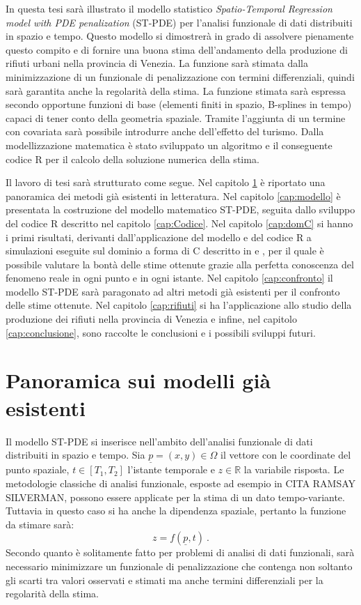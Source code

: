 \documentclass[a4paper,11pt,twoside,openright]{book}							%
\begin{document}
In questa tesi sarà illustrato il modello statistico \textit{Spatio-Temporal Regression model with PDE penalization} (ST-PDE) per l'analisi funzionale di dati distribuiti in spazio e tempo. Questo modello si dimostrerà in grado di assolvere pienamente questo compito e di fornire una buona stima dell'andamento della produzione di rifiuti urbani nella provincia di Venezia. La funzione sarà stimata dalla minimizzazione di un funzionale di penalizzazione con termini differenziali, quindi sarà garantita anche la regolarità della stima. La funzione stimata sarà espressa secondo opportune funzioni di base (elementi finiti in spazio, B-splines in tempo) capaci di tener conto della geometria spaziale. Tramite l'aggiunta di un termine con covariata sarà possibile introdurre anche dell'effetto del turismo. Dalla modellizzazione matematica è stato sviluppato un algoritmo e il conseguente codice R per il calcolo della soluzione numerica della stima. 

Il lavoro di tesi sarà strutturato come segue. Nel capitolo \ref{cap:panoramica} è riportato una panoramica dei metodi già esistenti in letteratura. Nel capitolo \ref{cap:modello} è presentata la costruzione del modello matematico ST-PDE, seguita dallo sviluppo del codice R descritto nel capitolo \ref{cap:Codice}. Nel capitolo \ref{cap:domC} si hanno i primi risultati, derivanti dall'applicazione del modello e del codice R a simulazioni eseguite sul dominio a forma di C descritto in \cite{art:ramsay} e \cite{art:wood}, per il quale è possibile valutare la bontà delle stime ottenute grazie alla perfetta conoscenza del fenomeno reale in ogni punto e in ogni istante. Nel capitolo \ref{cap:confronto} il modello ST-PDE sarà paragonato ad altri metodi già esistenti per il confronto delle stime ottenute. Nel capitolo \ref{cap:rifiuti} si ha l'applicazione allo studio della produzione dei rifiuti nella provincia di Venezia e infine, nel capitolo \ref{cap:conclusione}, sono raccolte le conclusioni e i possibili sviluppi futuri.
\newpage
\thispagestyle{empty}

\chapter{Panoramica sui modelli già esistenti}
\label{cap:panoramica}

Il modello ST-PDE si inserisce nell'ambito dell'analisi funzionale di dati distribuiti in spazio e tempo. Sia $\underline p = (x,y) \in \Omega$ il vettore con le coordinate del punto spaziale, $t \in [T_1,T_2]$ l'istante temporale e $z \in \mathbb{R}$ la variabile risposta. Le metodologie classiche di analisi funzionale, esposte ad esempio in CITA RAMSAY SILVERMAN, possono essere applicate per la stima di un dato tempo-variante. Tuttavia in questo caso si ha anche la dipendenza spaziale, pertanto la funzione da stimare sarà:
$$
z=f(\underline p,t) \ .
$$
Secondo quanto è solitamente fatto per problemi di analisi di dati funzionali, sarà necessario minimizzare un funzionale di penalizzazione che contenga non soltanto gli scarti tra valori osservati e stimati ma anche termini differenziali per la regolarità della stima.
\end{document}
